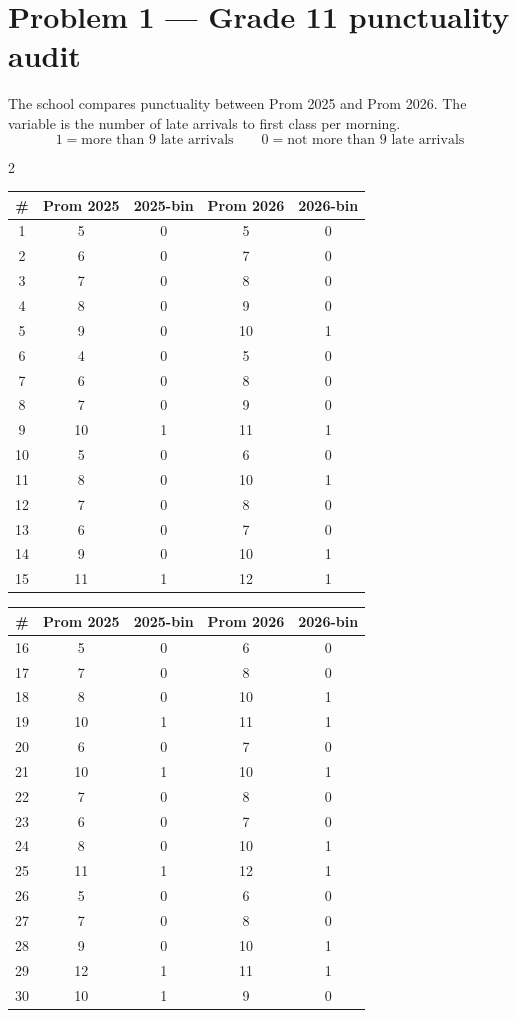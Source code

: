 \documentclass[12pt]{article}
\begin{document}
\section*{Problem 1 --- Grade 11 punctuality audit}
The school compares punctuality between Prom 2025 and Prom 2026. The variable is the number of late arrivals to first class per morning.
\[
1=\text{more than }9\text{ late arrivals}\qquad 0=\text{not more than }9\text{ late arrivals}
\]

\begin{multicols}{2}
\begin{center}\scriptsize
\begin{tabular}{|c|c|c|c|c|}\hline
\textbf{\#} & \textbf{Prom 2025} & \textbf{2025-bin} & \textbf{Prom 2026} & \textbf{2026-bin} \\\hline
1 & 5 & 0 & 5 & 0 \\
2 & 6 & 0 & 7 & 0 \\
3 & 7 & 0 & 8 & 0 \\
4 & 8 & 0 & 9 & 0 \\
5 & 9 & 0 & 10 & 1 \\
6 & 4 & 0 & 5 & 0 \\
7 & 6 & 0 & 8 & 0 \\
8 & 7 & 0 & 9 & 0 \\
9 & 10 & 1 & 11 & 1 \\
10 & 5 & 0 & 6 & 0 \\
11 & 8 & 0 & 10 & 1 \\
12 & 7 & 0 & 8 & 0 \\
13 & 6 & 0 & 7 & 0 \\
14 & 9 & 0 & 10 & 1 \\
15 & 11 & 1 & 12 & 1 \\\hline
\end{tabular}\end{center}
\columnbreak
\begin{center}\scriptsize
\begin{tabular}{|c|c|c|c|c|}\hline
\textbf{\#} & \textbf{Prom 2025} & \textbf{2025-bin} & \textbf{Prom 2026} & \textbf{2026-bin} \\\hline
16 & 5 & 0 & 6 & 0 \\
17 & 7 & 0 & 8 & 0 \\
18 & 8 & 0 & 10 & 1 \\
19 & 10 & 1 & 11 & 1 \\
20 & 6 & 0 & 7 & 0 \\
21 & 10 & 1 & 10 & 1 \\
22 & 7 & 0 & 8 & 0 \\
23 & 6 & 0 & 7 & 0 \\
24 & 8 & 0 & 10 & 1 \\
25 & 11 & 1 & 12 & 1 \\
26 & 5 & 0 & 6 & 0 \\
27 & 7 & 0 & 8 & 0 \\
28 & 9 & 0 & 10 & 1 \\
29 & 12 & 1 & 11 & 1 \\
30 & 10 & 1 & 9 & 0 \\\hline
\end{tabular}\end{center}
\end{multicols}
\end{document}

